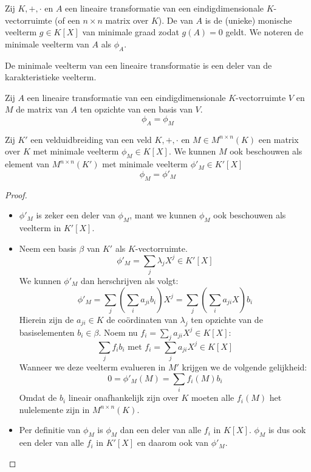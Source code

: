 \documentclass[main.tex]{subfiles}
\begin{document}
\begin{de}
  Zij $K,+,\cdot$ en $A$ een lineaire transformatie van een eindigdimensionale $K$-vectorruimte (of een $n\times n$ matrix over $K$).
  De  van $A$ is de (unieke) monische veelterm $g\in K[X]$ van minimale graad zodat $g(A) = 0$ geldt.
  We noteren de minimale veelterm van $A$ als $\phi_{A}$.
\end{de}

\begin{st}
  De minimale veelterm van een lineaire transformatie is een deler van de karakteristieke veelterm.
\end{st}

\begin{ei}
  Zij $A$ een lineaire transformatie van een eindigdimensionale $K$-vectorruimte $V$ en $M$ de matrix van $A$ ten opzichte van een basis van $V$.
  \[ \phi_{A} = \phi_{M} \]
\end{ei}

\begin{ei}
  Zij $K'$ een velduidbreiding van een veld $K,+,\cdot$ en $M\in M^{n\times n}(K)$ een matrix over $K$ met minimale veelterm $\phi_{M} \in K[X]$.
  We kunnen $M$ ook beschouwen als element van $M^{n\times n}(K')$ met minimale veelterm $\phi'_{M} \in K'[X]$
  \[ \phi_{M} = \phi'_{M} \]
  \begin{proof}
    \begin{itemize}
    \item $\phi'_{M}$ is zeker een deler van $\phi_{M}$, mant we kunnen $\phi_{M}$ ook beschouwen als veelterm in $K'[X]$.
    \item Neem een basis $\beta$ van $K'$ als $K$-vectorruimte.
      \[ \phi'_{M}= \sum_{j}\lambda_{j}X^{j} \in K'[X] \]
      We kunnen $\phi'_{M}$ dan herschrijven als volgt:
      \[ \phi'_{M} = \sum_{j}\left(\sum_{i}a_{ji}b_{i}\right)X^{j} = \sum_{j}\left(\sum_{i}a_{ji}X\right)b_{i} \]
      Hierein zijn de $a_{ji}\in K$ de co\"ordinaten van $\lambda_{j}$ ten opzichte van de basiselementen $b_{i}\in \beta$.
      Noem nu $f_{i}=\sum_{j}a_{ji}X^{j}\in K[X]$:
      \[ \sum_{j}f_{i}b_{i} \text{ met } f_{i}=\sum_{j}a_{ji}X^{j}\in K[X] \]
      Wanneer we deze veelterm evalueren in $M'$ krijgen we de volgende gelijkheid:
      \[0 = \phi'_{M}(M) = \sum_{i}f_{i}(M)b_{i} \]
      Omdat de $b_{i}$ lineair onafhankelijk zijn over $K$ moeten alle $f_{i}(M)$ het nulelemente zijn in $M^{n\times n}(K)$.

    \item Per definitie van $\phi_{M}$ is $\phi_{M}$ dan een deler van alle $f_{i}$ in $K[X]$.
      $\phi_{M}$ is dus ook een deler van alle $f_{i}$ in $K'[X]$ en daarom ook van $\phi'_{M}$.      
    \end{itemize}
  \end{proof}
\end{ei}
\end{document}
